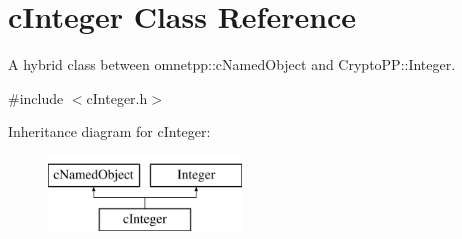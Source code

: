 \hypertarget{classcInteger}{}\section{c\+Integer Class Reference}
\label{classcInteger}


A hybrid class between omnetpp\+::c\+Named\+Object and Crypto\+P\+P\+::\+Integer.  




{\ttfamily \#include $<$c\+Integer.\+h$>$}

Inheritance diagram for c\+Integer\+:\begin{figure}[H]
\begin{center}
\leavevmode
\includegraphics[height=2.000000cm]{classcInteger}
\end{center}
\end{figure}
